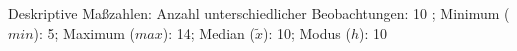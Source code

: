 				\label{tableValues:bsch04b_v1}
				\vspace*{-\baselineskip}
                    \begin{noten}
                	    \note{} Deskriptive Maßzahlen:
                	    Anzahl unterschiedlicher Beobachtungen: 10%
                	    ; 
                	      Minimum ($min$): 5; 
                	      Maximum ($max$): 14; 
                	      Median ($\tilde{x}$): 10; 
                	      Modus ($h$): 10
                     \end{noten}

